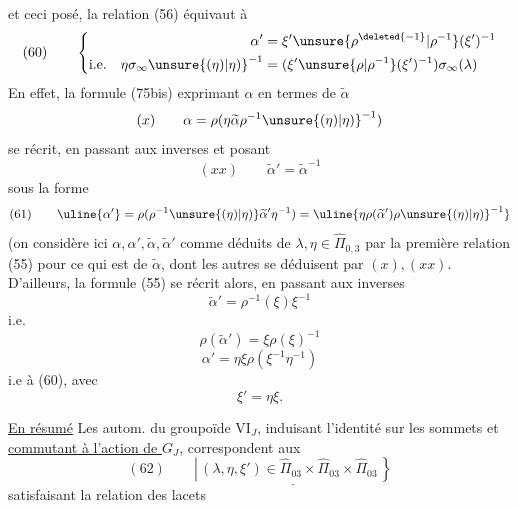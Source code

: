 et ceci posé, la relation (56) équivaut à
\[
(60)\qquad\left\{\begin{aligned}
\alpha'&=\xi'\unsure{\rho^{\deleted{-1}}|\rho^{-1}}(\xi')^{-1}\\
\text{i.e.}\quad\eta\sigma_\infty\unsure{(\eta)|\eta)}^{-1}&=(\xi'\unsure{\rho|\rho^{-1}}(\xi')^{-1})\sigma_\infty(\lambda)
\end{aligned}\right.
\]
\quad{}
En effet, la formule (75bis) exprimant $\alpha$ en termes de $\widetilde\alpha$ 
\[
(x)\qquad\alpha=\rho(\eta\widetilde\alpha\rho^{-1}\unsure{(\eta)|\eta)}^{-1})
\]
se récrit, en passant aux inverses et posant
\[
(xx)\qquad\widetilde\alpha'=\widetilde\alpha^{-1}
\]
sous la forme
\[
(61)\qquad\uline{\alpha'}=\rho(\rho^{-1}\unsure{(\eta)|\eta)}\widetilde\alpha'\eta^{-1})
=\uline{\eta\rho(\widetilde\alpha')\rho\unsure{(\eta)|\eta)}^{-1}}
\]
(on considère ici $\alpha,\alpha',\widetilde\alpha,\widetilde\alpha'$ comme déduits de $\lambda,\eta\in\widehat\Pi_{0,3}$ par la première relation (55) pour ce qui est de $\widetilde\alpha$, dont les autres se déduisent par $(x),(xx)$. D'ailleurs, la  formule (55) se récrit alors, en passant aux inverses
\[
\widetilde\alpha'=\rho^{-1}(\xi)\xi^{-1}
\]
i.e.
\[
\rho(\widetilde\alpha')=\xi\rho(\xi)^{-1}
\]
\[
\alpha'=\eta\xi\rho(\xi^{-1}\eta^{-1})
\]
\unsure{,|)}
i.e à (60), avec
\[
\xi'=\eta\xi.
\]

\uline{En résumé} Les autom. du groupoïde $\mathrm{VI}_J$, induisant l'identité sur les sommets et \uline{commutant à l'action de $G_J$}, correspondent aux
\[
(62)\qquad\underline{\left|\,(\lambda,\eta,\xi')\in\widehat\Pi_{03}\times\widehat\Pi_{03}\times\widehat\Pi_{03}\,\right\}}
\]
satisfaisant la relation des lacets 

